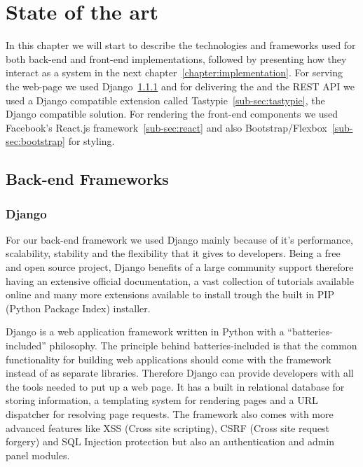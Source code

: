 \chapter{State of the art}
\label{chapter:state}

In this chapter we will start to describe the technologies and frameworks used for both back-end and front-end implementations, followed by presenting how they interact as a system in the next chapter~\ref{chapter:implementation}. For serving the web-page we used Django~\ref{sub-sec:django} and for delivering the and the REST API we used a Django compatible extension called Tastypie~\ref{sub-sec:tastypie}, the Django compatible solution. For rendering the front-end components we used Facebook's React.js framework~\ref{sub-sec:react} and also Bootstrap/Flexbox~\ref{sub-sec:bootstrap} for styling.

\section{Back-end Frameworks}
\label{sec:backend}

\subsection{Django}
\label{sub-sec:django}

For our back-end framework we used Django mainly because of it's performance, scalability, stability and the flexibility that it gives to developers. Being a free and open source project, Django benefits of a large community support therefore having an extensive official documentation, a vast collection of tutorials available online and many more extensions available to install trough the built in PIP (Python Package Index) installer.

Django is a web application framework written in Python with a ``batteries-included'' philosophy. The principle behind batteries-included is that the common functionality for building web applications should come with the framework instead of as separate libraries. Therefore Django can provide developers with all the tools needed to put up a web page. It has a built in relational database for storing information, a templating system for rendering pages and a URL dispatcher for resolving page requests. The framework also comes with more advanced features like XSS (Cross site scripting), CSRF (Cross site request forgery) and SQL Injection protection but also an authentication and admin panel modules.

